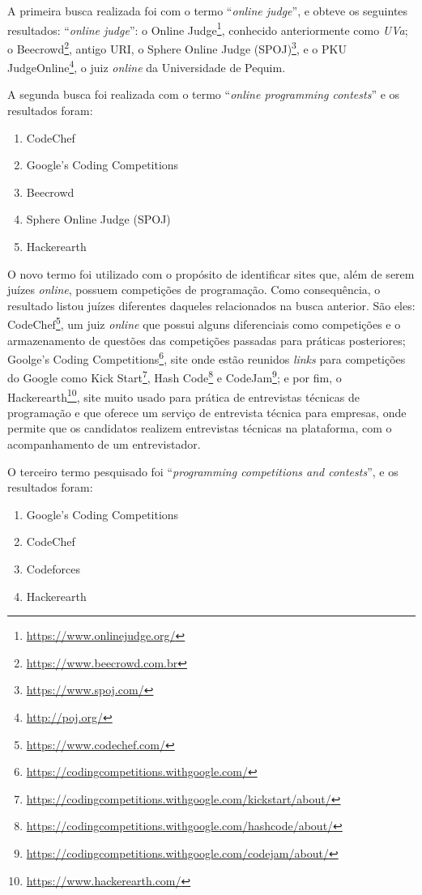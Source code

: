 A primeira busca realizada foi com o termo ``\textit{online judge}'', e obteve os seguintes resultados: ``\textit{online judge}'': o Online Judge\footnote{\url{https://www.onlinejudge.org/}}, conhecido anteriormente como \textit{UVa};
o Beecrowd\footnote{\url{https://www.beecrowd.com.br}}, antigo URI,
o Sphere Online Judge (SPOJ)\footnote{\url{https://www.spoj.com/}}, e o PKU JudgeOnline\footnote{\url{http://poj.org/}}, o juiz \textit{online} da Universidade de Pequim.

A segunda busca foi realizada com o termo ``\textit{online programming contests}'' e os resultados foram:

\begin{enumerate}
    \item CodeChef
    \item Google's Coding Competitions
    \item Beecrowd
    \item Sphere Online Judge (SPOJ)
    \item Hackerearth
\end{enumerate}

O novo termo foi utilizado com o propósito de identificar sites que, além de serem juízes \textit{online}, possuem competições de programação. Como consequência, o resultado listou juízes diferentes daqueles relacionados na busca anterior. São eles: CodeChef\footnote{\url{https://www.codechef.com/}}, um juiz \textit{online} que possui alguns diferenciais como competições e o armazenamento de questões das competições passadas para práticas posteriores; Goolge's Coding Competitions\footnote{\url{https://codingcompetitions.withgoogle.com/}}, site onde estão reunidos \textit{links} para competições do Google como Kick Start\footnote{\url{https://codingcompetitions.withgoogle.com/kickstart/about/}}, Hash Code\footnote{\url{https://codingcompetitions.withgoogle.com/hashcode/about/}} e CodeJam\footnote{\url{https://codingcompetitions.withgoogle.com/codejam/about/}}; e por fim, o Hackerearth\footnote{\url{https://www.hackerearth.com/}}, site muito usado para prática de entrevistas técnicas de programação e que oferece um serviço de entrevista técnica para empresas, onde permite que os candidatos realizem entrevistas técnicas na plataforma, com o acompanhamento de um entrevistador.

O terceiro termo pesquisado foi ``\textit{programming competitions and contests}'', e os resultados foram:

\begin{enumerate}
    \item Google's Coding Competitions
    \item CodeChef
    \item Codeforces
    \item Hackerearth
\end{enumerate}

